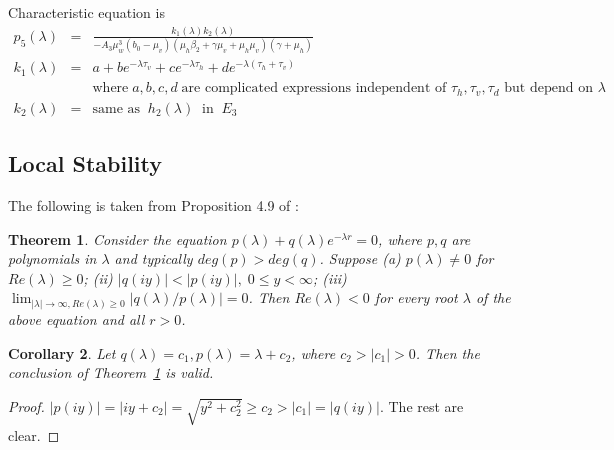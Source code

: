 \documentclass[12pt,leqno]{article}
\newtheorem{Theorem}{Theorem}[section]
\newtheorem{Corollary}[Theorem]{Corollary}%
\begin{document}
\quad
Characteristic equation is
\begin{eqnarray*}
p_5(\lambda) &=& \displaystyle\frac{k_1(\lambda)k_2(\lambda)}{-A_3\mu_w^3(b_0-\mu_v)(\mu_h\beta_2+\gamma\mu_v+\mu_h\mu_v)(\gamma+\mu_h)}\\
k_1(\lambda) &=& a + be^{-\lambda\tau_v} + ce^{-\lambda\tau_h} + 
de^{-\lambda(\tau_h+\tau_v)}\\
&& \mbox{where} \;a,b,c,d \;\mbox{are complicated expressions independent of $\tau_h, \tau_v, \tau_d$ but depend on $\lambda$}\\
k_2(\lambda) &=& \mbox{same as}\;\; h_2(\lambda)\;\;\mbox{in}\;\;E_3
\end{eqnarray*}

\subsection{Local Stability}

The following is taken from Proposition 4.9 of \cite{Smith2011}:
\begin{Theorem}\label{tran}
Consider the equation $p(\lambda)+q(\lambda)e^{-\lambda r}=0$, where $p, q$ are polynomials in $\lambda$ and typically $deg(p) > deg(q)$. Suppose (a) $p(\lambda) \neq 0$ for $Re(\lambda)\geq 0$; (ii) $|q(iy)|<|p(iy)|,\;0\leq y < \infty$; (iii) $\lim_{|\lambda| \rightarrow \infty, Re(\lambda) \geq 0} |q(\lambda)/p(\lambda)| = 0$. Then $Re(\lambda) < 0$ for every root $\lambda$ of the above equation and all $r > 0$. 
\end{Theorem}
\begin{Corollary}\label{trancoro}
Let $q(\lambda) = c_1, p(\lambda) = \lambda + c_2$, where $c_2 > |c_1| > 0$. Then the conclusion of Theorem~\ref{tran} is valid.
\end{Corollary}
\begin{proof}
$|p(iy)| = |iy + c_2| = \sqrt{y^2+c_2^2} \geq c_2 > |c_1| = |q(iy)|$. The rest are clear.
\end{proof}
\end{document}

